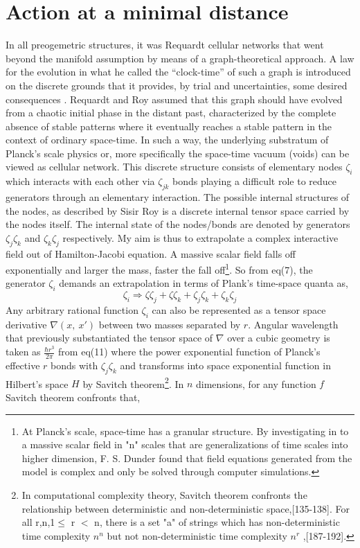 \documentclass{article}
\begin{document}
\section{Action at a minimal distance}
In all preogemetric structures, it was Requardt cellular networks that went beyond the manifold assumption by means of a graph-theoretical approach. A law for the evolution in what he called the “clock-time” of such a graph is introduced on the discrete grounds that it provides, by trial and uncertainties, some desired consequences \cite{12}. Requardt and Roy  assumed that this graph should have evolved from a chaotic initial phase in the distant past, characterized by the complete absence of stable patterns where it eventually reaches a stable pattern in the context of ordinary space-time. In such a way, the underlying substratum of Planck's scale physics or, more specifically the space-time vacuum (voids) can be viewed as cellular network\cite{13}. This discrete structure consists of elementary nodes $\zeta_{i}$ which interacts with each other via $\zeta_{jk}$ bonds playing a difficult role to reduce generators through an elementary interaction. The possible internal structures of the nodes, as described by Sisir Roy is a discrete internal tensor space carried by the nodes itself. The internal state of the nodes/bonds are denoted by generators $
\zeta_{j} \zeta_{k}$ and  $\zeta_{k} \zeta_{j}$ respectively. My aim is thus to extrapolate a complex interactive field out of Hamilton-Jacobi equation.\newline
A massive scalar field falls off exponentially and larger the mass, faster the fall off\footnote{At Planck's scale, space-time has a granular structure. By investigating in to a massive scalar field in "n" scales that are generalizations of time scales into higher dimension, F. S. Dunder found that field equations generated from the model is complex and only be solved through computer simulations\cite{14}.}. So from eq(7), the generator $\zeta_{i}$ demands an extrapolation in terms of Plank’s time-space quanta as, 
\begin{equation}
     \zeta_{i} \Rightarrow \zeta \zeta_{j}+\zeta \zeta_{k}+\zeta_{j}\zeta_{k}+\zeta_{k}\zeta_{j} 
 \end{equation}
Any arbitrary rational function $\zeta_i$ can also be represented as a tensor space derivative $\nabla (x,\ x')$ between two masses separated by $r$. Angular wavelength that previously substantiated the tensor space of $\nabla$ over a cubic geometry is taken as $\frac{\hbar r^{3}}{2 \pi }$ from eq(11) where the power exponential function of Planck’s effective $r$ bonds with $\zeta_{j} \zeta_{k}$ and transforms into space exponential function in Hilbert’s space $H$ by Savitch theorem\footnote{In computational complexity theory, Savitch theorem confronts the relationship between deterministic and non-deterministic space\cite{15},[135-138]. For all r,n,1$\leq$ r $<$ n, there is a set "a" of strings which has non-deterministic time complexity $n^n$ but not non-deterministic time complexity $n^r$ \cite{16},[187-192]. }. In $n$ dimensions, for any function $f$ Savitch theorem confronts that,
\end{document}
